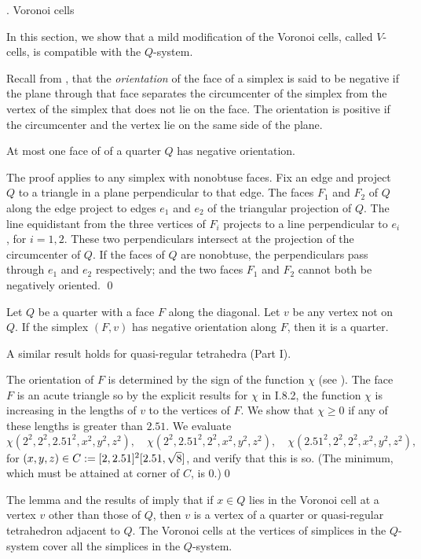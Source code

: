 . Voronoi cells\endhead

In this section,  we
show that a mild modification of the Voronoi cells, called $V$-cells,
is compatible with the $Q$-system.

Recall from \cite{I.8.2}, that the {\it orientation\/} of the face of a simplex
is said to be negative if the plane through that face separates the
circumcenter of the simplex from the vertex of the simplex that does
not lie on the face.  The orientation is positive if the circumcenter
and the vertex lie on the same side of the plane.

   At most one face of of a quarter $Q$ has
negative orientation.
\endproclaim

  The proof applies to any simplex with nonobtuse faces.
 Fix an edge and project $Q$ to a triangle in a
plane perpendicular to that edge.
The faces $F_1$ and $F_2$ of $Q$ along the edge
project to edges $e_1$ and $e_2$ of the triangular projection of $Q$.
The line equidistant from the three vertices of $F_i$ 
projects to a line perpendicular to $e_i$, for $i=1,2$.  These two
perpendiculars intersect at the projection of the circumcenter of
$Q$.  If the faces of $Q$ are nonobtuse,
the perpendiculars pass through $e_1$ and $e_2$
respectively; and the two faces $F_1$ and $F_2$ cannot both be 
negatively oriented.  \qed\enddemo

  Let $Q$ be a quarter with a face $F$
along the diagonal.  Let $v$ be any
vertex not on $Q$.   If the simplex $(F,v)$
has negative orientation along $F$, then it is a quarter.
\endproclaim

A similar result holds for quasi-regular tetrahedra (Part I).

  The orientation of $F$ is determined by 
the sign of the function $\chi$ (see \cite{I.8.2}).
The face $F$ is an acute triangle so by the explicit results for
$\chi$ in I.8.2, the function $\chi$
is increasing in the lengths of $v$ to the vertices of $F$.
  We show that $\chi\ge0$ if any of these lengths is greater than
$2.51$.  We evaluate
$$\chi(2^2,2^2,2.51^2,x^2,y^2,z^2), \quad
\chi(2^2,2.51^2,2^2,x^2,y^2,z^2),  \quad
\chi(2.51^2,2^2,2^2,x^2,y^2,z^2),$$
for $(x,y,z)\in C:=[2,2.51]^2[2.51,\sqrt8]$,
and verify that this is so.  (The minimum, which must be
attained at corner of $C$, is  $0$.)\qed\enddemo

The lemma and the results of \cite{I} imply 
that if $x\in Q$ lies in the Voronoi cell at a
vertex $v$ other than those of $Q$, then $v$ is a vertex of a
quarter or quasi-regular tetrahedron adjacent to $Q$.
The Voronoi cells at the vertices
of simplices in the $Q$-system cover all the simplices in the $Q$-system.

